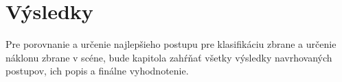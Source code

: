
\chapter{Výsledky}
Pre porovnanie a určenie najlepšieho postupu pre klasifikáciu zbrane a určenie náklonu zbrane v scéne,
    bude kapitola zahŕňať všetky výsledky navrhovaných postupov, ich popis a finálne vyhodnotenie.









